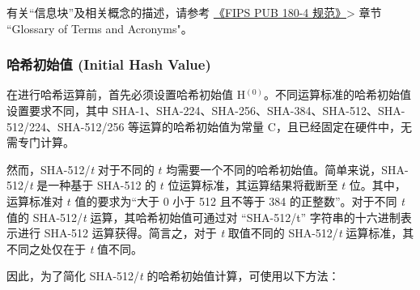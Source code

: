 \documentclass[main\_\_CN.tex]{subfiles}
\begin{document}
\begin{tiplisting}
有关“信息块”及相关概念的描述，请参考 \href{https://doi.org/10.6028/NIST.FIPS.180-4}{《FIPS PUB 180-4 规范》}> 章节 ``Glossary of Terms and Acronyms"。
\end{tiplisting}


\subsubsection{哈希初始值 (Initial Hash Value)}\label{sec:sha-initialhash}

在进行哈希运算前，首先必须设置哈希初始值 H$^{(0)}$。不同运算标准的哈希初始值设置要求不同，其中 SHA-1、SHA-224、SHA-256、SHA-384、SHA-512、SHA-512/224、SHA-512/256 等运算的哈希初始值为常量 C，且已经固定在硬件中，无需专门计算。

然而，SHA-512/{\it{t}} 对于不同的 \begin{math}t\end{math} 均需要一个不同的哈希初始值。简单来说，SHA-512/{\it{t}} 是一种基于 SHA-512 的 \begin{math}t\end{math} 位运算标准，其运算结果将截断至 \begin{math}t\end{math} 位。其中，运算标准对 \begin{math}t\end{math} 值的要求为“大于 0 小于 512 且不等于 384 的正整数”。对于不同 {\it{t}} 值的 SHA-512/{\it{t}} 运算，其哈希初始值可通过对 ``SHA-512/t” 字符串的十六进制表示进行 SHA-512 运算获得。简言之，对于 {\it{t}} 取值不同的 SHA-512/{\it{t}} 运算标准，其不同之处仅在于 {\it{t}} 值不同。

因此，为了简化 SHA-512/{\it{t}} 的哈希初始值计算，可使用以下方法：
\end{document}
